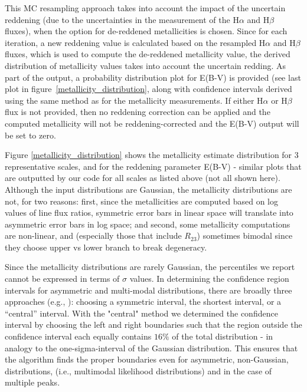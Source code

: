 \documentclass{emulateapj}
\begin{document}
This MC resampling approach takes into account the impact of the uncertain reddening (due to the uncertainties in the measurement of the 
H$\alpha$ and H$\beta$ fluxes), when the option for de-reddened metallicities is chosen. Since for each iteration, a new reddening value is calculated based on the resampled H$\alpha$ and H$\beta$ fluxes, which is used to compute the de-reddened metallicity value, the derived distribution of metallicity values takes into account the uncertain redding. As part of the output, a probability distribution plot for E(B-V) is provided (see last plot in figure~\ref{metallicity_distribution}, along with confidence intervals derived using the same method as for the metallicity measurements. If either H$\alpha$ or H$\beta$ flux is not provided, then no reddening correction can be applied and the computed metallicity will not be  reddening-corrected and the E(B-V) output will be set to zero.

Figure \ref{metallicity_distribution} shows the metallicity estimate distribution for 3 representative scales, and for the reddening parameter E(B-V) - similar plots that are outputted by our code for all scales as listed above (not all shown here). Although the input distributions are Gaussian, the metallicity distributions 
are not, for two reasons: first, since the metallicities are computed based on log values of line flux ratios, symmetric error bars in linear space will translate into asymmetric error bars in log space; and second, some metallicity computations are non-linear, and (especially those that include $R_{23}$) sometimes bimodal since they choose upper vs lower branch to break degeneracy.

Since the metallicity distributions are rarely Gaussian, the percentiles we report cannot be expressed in terms of $\sigma$ values. In determining the confidence region intervals for asymmetric and multi-modal distributions, there are broadly three approaches (e.g., \citealt{andrae10}): choosing a symmetric interval, the shortest interval,  or a ``central'' interval.  With the "central" method we determined the  confidence interval by choosing the left and right boundaries such that the region outside the confidence interval each equally contains $16\%$ of the total distribution - in analogy to the one-sigma-interval of the Gaussian distribution. This ensures that the algorithm finds the proper boundaries even for asymmetric, non-Gaussian, distributions, (i.e., multimodal likelihood distributions) and in the case of multiple peaks. 
\end{document}
